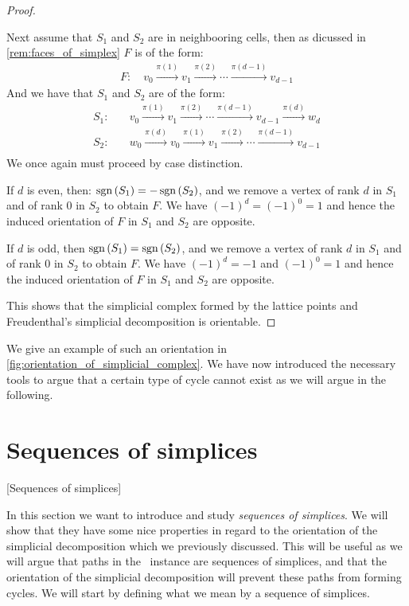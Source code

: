 \begin{proof}
    \begin{case}{2}
        Next assume that $S_1$ and $S_2$ are in neighbooring cells, then as dicussed in \cref{rem:faces_of_simplex} $F$ is of the form:
        \begin{align*}
            F: \quad v_0 \xrightarrow{\pi(1)} v_1 \xrightarrow{\pi(2)} \cdots  \xrightarrow{\pi(d-1)} v_{d-1}
        \end{align*}
        And we have that $S_1$ and $S_2$ are of the form:
        \begin{align*}
            S_1: & \quad v_0 \xrightarrow{\pi(1)} v_1 \xrightarrow{\pi(2)} \cdots \xrightarrow{\pi(d-1)} v_{d-1} \xrightarrow{\pi(d)} w_d \\
            S_2: & \quad w_0 \xrightarrow{\pi(d)} v_0 \xrightarrow{\pi(1)} v_1 \xrightarrow{\pi(2)} \cdots \xrightarrow{\pi(d-1)} v_{d-1} \\
        \end{align*}
        We once again must proceed by case distinction.
        \begin{case}{2.1}
            If $d$ is even, then: $\operatorname{sgn}\left(S_1\right) = - \operatorname{sgn}\left(S_2\right)$, and we remove a vertex of rank $d$ in $S_1$ and of rank $0$ in $S_2$ to obtain $F$. We have $(-1)^d = (-1)^0 = 1$ and hence the induced orientation of $F$ in $S_1$ and $S_2$ are opposite.
        \end{case}
        \begin{case}{2.2}
            If $d$ is odd, then $\operatorname{sgn}\left(S_1\right) = \operatorname{sgn}\left(S_2\right)$, and we remove a vertex of rank $d$ in $S_1$ and of rank $0$ in $S_2$ to obtain $F$. We have $(-1)^d = -1$ and $(-1)^0 = 1$ and hence the induced orientation of $F$ in $S_1$ and $S_2$ are opposite.
        \end{case}
    \end{case}
    This shows that the simplicial complex formed by the lattice points and Freudenthal's simplicial decomposition is orientable.
\end{proof}

We give an example of such an orientation in \cref{fig:orientation_of_simplicial_complex}. We have now introduced the necessary tools to argue that a certain type of cycle cannot exist as we will argue in the following.

\section{Sequences of simplices}[Sequences of simplices]

In this section we want to introduce and study \emph{sequences of simplices}. We will show that they have some nice properties in regard to the orientation of the simplicial decomposition which we previously discussed. This will be useful as we will argue that paths in the \EndOfLine\ instance are sequences of simplices, and that the orientation of the simplicial decomposition will prevent these paths from forming cycles. We will start by defining what we mean by a sequence of simplices.

